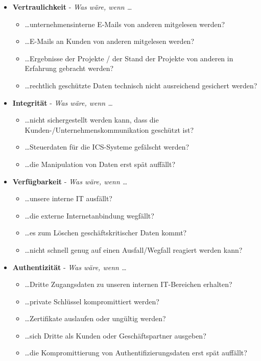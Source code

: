 \begin{itemize}
\itemsep0.5em
\item \textbf{Vertraulichkeit} - \textit{Was wäre, wenn \ldots}
\begin{itemize}
\item[] \ldots unternehmensinterne E-Mails von anderen mitgelesen werden?
\item[] \ldots E-Mails an Kunden von anderen mitgelesen werden?
\item[] \ldots Ergebnisse der Projekte / der Stand der Projekte von anderen in Erfahrung gebracht werden?
\item[] \ldots rechtlich geschützte Daten technisch nicht ausreichend gesichert werden?
\end{itemize}
\item \textbf{Integrität} - \textit{Was wäre, wenn \ldots}
\begin{itemize}
\item[] \ldots nicht sichergestellt werden kann, dass die Kunden-/Unternehmenskommunikation geschützt ist?
\item[] \ldots Steuerdaten für die ICS-Systeme gefälscht werden?
\item[] \ldots die Manipulation von Daten erst spät auffällt?
\end{itemize}
\item \textbf{Verfügbarkeit} - \textit{Was wäre, wenn \ldots}
\begin{itemize}
\item[] \ldots unsere interne IT ausfällt?
\item[] \ldots die externe Internetanbindung wegfällt?
\item[] \ldots es zum Löschen geschäftskritischer Daten kommt?
\item[] \ldots nicht schnell genug auf einen Ausfall/Wegfall reagiert werden kann?
\end{itemize}
\item \textbf{Authentizität} - \textit{Was wäre, wenn \ldots}
\begin{itemize}
\item[] \ldots Dritte Zugangsdaten zu unseren internen IT-Bereichen erhalten?
\item[] \ldots private Schlüssel kompromittiert werden?
\item[] \ldots Zertifikate auslaufen oder ungültig werden?
\item[] \ldots sich Dritte als Kunden oder Geschäftspartner ausgeben?
\item[] \ldots die Kompromittierung von Authentifizierungsdaten erst spät auffällt?
\end{itemize}
\end{itemize}

